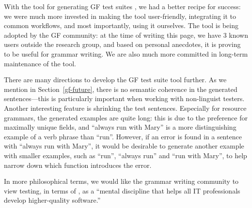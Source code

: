 With the tool for generating GF test suites
\cite{listenmaa_claessen2018}, we had a better recipe for success: we
were much more invested in making the tool user-friendly, integrating
it to common workflows, and most importantly, using it ourselves. The
tool is being adopted by the GF community: at the time of writing this
page, we have 3 known users outside the research group, and based on
personal anecdotes, it is proving to be useful for grammar writing. We
are also much more committed in long-term maintenance of the tool.

There are many directions to develop the GF test suite tool further.
As we mention in Section~\ref{gf-future}, there is no semantic
coherence in the generated sentences---this is particularly important
when working with non-linguist testers.  Another interesting feature
is shrinking the test sentences. Especially for resource grammars, the
generated examples are quite long: this is due to the preference for
maximally unique fields, and ``always run with Mary'' is a more
distinguishing example of a verb phrase than ``run''. However, if an
error is found in a sentence with ``always run with Mary'', it would
be desirable to generate another example with smaller examples, such
as ``run'', ``always run'' and ``run with Mary'', to help narrow down
which function introduces the error.

In more philosophical terms, we would like the grammar writing
community to view testing, in terms of \cite{beizer2003software}, as a
``mental discipline that helps all IT professionals develop
higher-quality software.'' 

